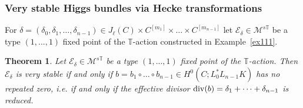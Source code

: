 \documentclass[12pt]{article}
\numberwithin{equation}{section}
\renewcommand{\div}{{\rm div}}
\newtheorem{theorem}{Theorem}
\theoremstyle{remark}
\theoremstyle{definition}
\numberwithin{theorem}{section}
\def\calE{{\mathcal E}}
\def\M{{\mathcal{M}}}
\newcommand{\T}{{\mathbb{T}}}
\def\d{{{\delta}}}
\renewcommand{\1}{\mathbbm{1}}
\begin{document}
\subsubsection{Very stable Higgs bundles via Hecke transformations}



For $\delta=(\delta_0,\delta_1,\dots,\delta_{n-1})\in J_\ell(C)\times C^{[m_1]}\times \dots \times C^{[m_{n-1}]}$ let $\calE_{\d}\in \M^{s\T}$ be a type $(1,...,1)$ fixed point of the $\T$-action constructed in Example~\ref{ex111}.

\begin{theorem} \label{mainverystable} Let $\calE_{\d} \in \M^{s\T}$ be a type $(1,...,1)$ fixed point of the $\T$-action. Then $\calE_{\d}$ is very stable if and only if $b=b_1\circ\dots \circ b_{n-1}\in H^0(C;L_0^*L_{n-1}K)$ has no repeated zero, i.e. if and only if the effective divisor $\div(b)=\delta_1+\dots+\delta_{n-1}$ is reduced. 
\end{theorem}
\end{document}
